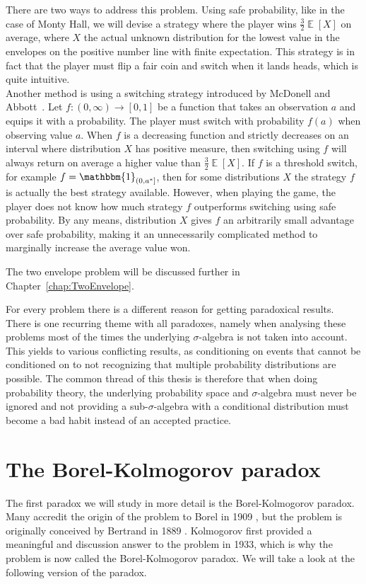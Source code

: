 \documentclass[a4paper]{report}
\theoremstyle{plain}
\theoremstyle{definition}
\theoremstyle{remark}
\numberwithin{equation}{chapter}
\DeclareMathOperator{\E}{\mathbb{E}}
\DeclareMathOperator{\1}{\mathbbm{1}}
\begin{document}
There are two ways to address this problem. Using safe probability, like in the case of Monty Hall, we will devise a strategy where the player wins $\frac{3}{2}\E[X]$ on average, where $X$ the actual unknown distribution for the lowest value in the envelopes on the positive number line with finite expectation. This strategy is in fact that the player must flip a fair coin and switch when it lands heads, which is quite intuitive.\\
Another method is using a switching strategy introduced by McDonell and Abbott~\cite{McDonnell09,Abbott10,McDonnell11}. Let $f\colon (0,\infty)\to[0,1]$ be a function that takes an observation $a$ and equips it with a probability. The player must switch with probability $f(a)$ when observing value $a$. When $f$ is a decreasing function and strictly decreases on an interval where distribution $X$ has positive measure, then switching using $f$ will always return on average a higher value than $\frac{3}{2}\E[X]$. If $f$ is a threshold switch, for example $f=\1_{(0,a^*]}$, then for some distributions $X$ the strategy $f$ is actually the best strategy available. However, when playing the game, the player does not know how much strategy $f$ outperforms switching using safe probability. By any means, distribution $X$ gives $f$ an arbitrarily small advantage over safe probability, making it an unnecessarily complicated method to marginally increase the average value won.

The two envelope problem will be discussed further in Chapter~\ref{chap:TwoEnvelope}.

For every problem there is a different reason for getting paradoxical results. There is one recurring theme with all paradoxes, namely when analysing these problems most of the times the underlying $\sigma$-algebra is not taken into account. This yields to various conflicting results, as conditioning on events that cannot be conditioned on to not recognizing that multiple probability distributions are possible. The common thread of this thesis is therefore that when doing probability theory, the underlying probability space and $\sigma$-algebra must never be ignored and not providing a sub-$\sigma$-algebra with a conditional distribution must become a bad habit instead of an accepted practice.

\chapter{The Borel-Kolmogorov paradox}\label{chap:BorelKolmogorov}
The first paradox we will study in more detail is the Borel-Kolmogorov paradox. Many accredit the origin of the problem to Borel in 1909 \cite{Borel09}, but the problem is originally conceived by Bertrand in 1889 \cite{Bertrand89}. Kolmogorov \cite{Kolmogorov33} first provided a meaningful and discussion answer to the problem in 1933, which is why the problem is now called the Borel-Kolmogorov paradox. We will take a look at the following version of the paradox.
\end{document}
